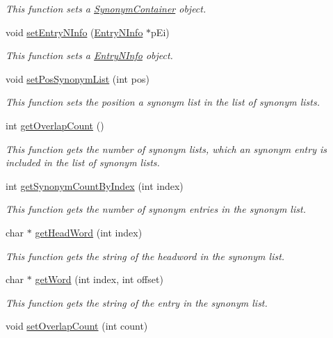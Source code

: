 \begin{CompactItemize}
\begin{CompactList}\small\item\em This function sets a \hyperlink{classkmaOrange_1_1SynonymContainer}{SynonymContainer} object. \item\end{CompactList}\item 
void \hyperlink{classkmaOrange_1_1Synonym_6033a3dc7ea799098a142ac2f2f2f04f}{setEntryNInfo} (\hyperlink{classkmaOrange_1_1EntryNInfo}{EntryNInfo} $\ast$pEi)
\begin{CompactList}\small\item\em This function sets a \hyperlink{classkmaOrange_1_1EntryNInfo}{EntryNInfo} object. \item\end{CompactList}\item 
void \hyperlink{classkmaOrange_1_1Synonym_5ce7eeebcb9e7ad3f0749cebffbe5465}{setPosSynonymList} (int pos)
\begin{CompactList}\small\item\em This function sets the position a synonym list in the list of synonym lists. \item\end{CompactList}\item 
int \hyperlink{classkmaOrange_1_1Synonym_0004ea3dc231d3740211d96d036ef976}{getOverlapCount} ()
\begin{CompactList}\small\item\em This function gets the number of synonym lists, which an synonym entry is included in the list of synonym lists. \item\end{CompactList}\item 
int \hyperlink{classkmaOrange_1_1Synonym_7d808654c78ba40bca5caa7d622e931d}{getSynonymCountByIndex} (int index)
\begin{CompactList}\small\item\em This function gets the number of synonym entries in the synonym list. \item\end{CompactList}\item 
char $\ast$ \hyperlink{classkmaOrange_1_1Synonym_c15a3ecb61bc07409975df19fee47f6d}{getHeadWord} (int index)
\begin{CompactList}\small\item\em This function gets the string of the headword in the synonym list. \item\end{CompactList}\item 
char $\ast$ \hyperlink{classkmaOrange_1_1Synonym_96f92eecdd58a5be11e411cbb6eeb087}{getWord} (int index, int offset)
\begin{CompactList}\small\item\em This function gets the string of the entry in the synonym list. \item\end{CompactList}\item 
void \hyperlink{classkmaOrange_1_1Synonym_c95ea384c1e83ee8ae95239fa571d035}{setOverlapCount} (int count)
\end{CompactItemize}
